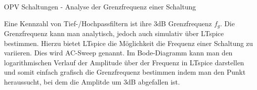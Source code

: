 \begin{frame}[t]{OPV Schaltungen - Analyse der Grenzfrequenz einer Schaltung }

  \begin{spacing}{0.6} \begin{tiny}
      Eine Kennzahl von Tief-/Hochpassfiltern ist ihre 3dB Grenzfrequenz $f_g$. Die Grenzfrequenz kann man analytisch, jedoch auch simulativ
      über LTspice bestimmen. Hierzu bietet LTspice die Möglichkeit die Frequenz einer Schaltung zu variieren. Dies wird AC-Sweep genannt.
      Im Bode-Diagramm kann man den logarithmischen Verlauf der Amplitude über der Frequenz in LTspice darstellen und
      somit einfach grafisch die Grenzfrequenz bestimmen indem man den Punkt heraussucht, bei dem die Amplitde um 3dB abgefallen ist.
    \end{tiny} \end{spacing}


\end{frame}
